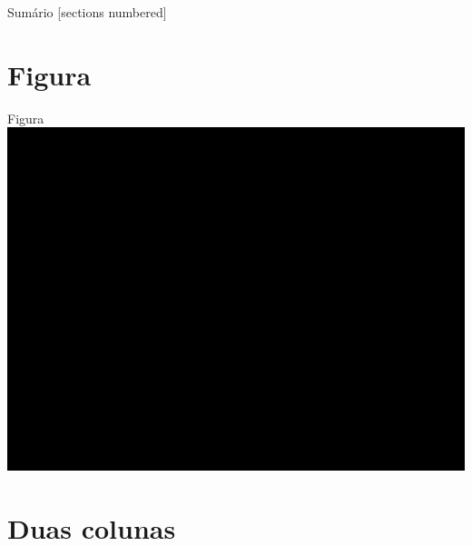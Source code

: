 \documentclass[aspectratio=1610, 12pt]{beamer}
\begin{document}
\begin{frame}{Sumário}
	[sections numbered]
	\tableofcontents[hideallsubsections]
\end{frame}

\section{Figura}

\begin{frame}{Figura}
	\centering
	\includegraphics[width=.7\textwidth]{fig/talkLogo}
\end{frame}

\section{Duas colunas}
\end{document}
